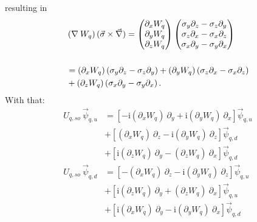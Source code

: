 \documentclass[3p]{elsarticle}
\begin{document}
\begin{itemize}
resulting in
\begin{align}
&\left( \nabla \:W_q \right) ( \vec{\sigma} \times  \vec{\nabla} ) =   \begin{pmatrix} \partial_x W_q \\ \partial_y W_q \\ \partial_z W_q \end{pmatrix}  \begin{pmatrix} \sigma_y \partial_z -\sigma_z \partial_y \\ \sigma_z \partial_x - \sigma_x \partial_z \\ \sigma_x \partial_y - \sigma_y \partial_x \end{pmatrix} \\
\newline \nonumber\\
&=  (\partial_x W_q) \left( \sigma_y \partial_z - \sigma_z \partial_y \right) + (\partial_y W_q) \left( \sigma_z \partial_x - \sigma_x \partial_z \right) \nonumber\\
&+  (\partial_z W_q) \left( \sigma_x \partial_y - \sigma_y \partial_x \right) .
\end{align}
With that:
\begin{align}
U_{q,so} \: \vec{\psi}_{q,u} & = \left[ - \mathrm{i} (\partial_x W_q) \: \partial_y + \mathrm{i} (\partial_y W_q) \: \partial_x \right] \vec{\psi}_{q,u} \nonumber\\
&+ \left[ (\partial_x W_q) \: \partial_z  - \mathrm{i} (\partial_y W_q) \: \partial_z \right] \vec{\psi}_{q,d} \nonumber\\
&+ \left[ \mathrm{i} (\partial_z W_q) \: \partial_y - (\partial_z W_q) \: \partial_x \right] \vec{\psi}_{q,d}  
\label{Uso1}\\
U_{q,so} \: \vec{\psi}_{q,d} & = \left[ - (\partial_x W_q) \: \partial_z - \mathrm{i} (\partial_y W_q) \: \partial_z \right] \vec{\psi}_{q,u} \nonumber\\
&+ \left[ \mathrm{i} (\partial_z W_q) \: \partial_y + (\partial_z W_q) \: \partial_x \right] \vec{\psi}_{q,u} \nonumber\\
&+ \left[ \mathrm{i} (\partial_x W_q) \: \partial_y - \mathrm{i} (\partial_y W_q) \: \partial_x \right] \vec{\psi}_{q,d}
\label{Uso2}
\end{align}
\end{itemize}
\end{document}

